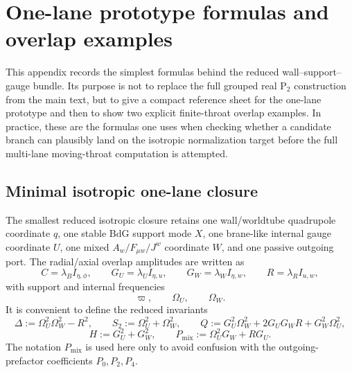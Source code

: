 \documentclass[11pt]{article}
\theoremstyle{definition}
\newcommand{\Ptwo}{\ensuremath{\mathrm{P}_2}}
\begin{document}
\section{One-lane prototype formulas and overlap examples}
\label{app:one-lane-overlap}

This appendix records the simplest formulas behind the reduced wall--support--gauge bundle. Its purpose is not to replace the full grouped real $\Ptwo$ construction from the main text, but to give a compact reference sheet for the one-lane prototype and then to show two explicit finite-throat overlap examples. In practice, these are the formulas one uses when checking whether a candidate branch can plausibly land on the isotropic normalization target before the full multi-lane moving-throat computation is attempted.

\subsection{Minimal isotropic one-lane closure}

The smallest reduced isotropic closure retains one wall/worldtube quadrupole coordinate $q$, one stable BdG support mode $X$, one brane-like internal gauge coordinate $U$, one mixed $A_w/F_{\mu w}/J^w$ coordinate $W$, and one passive outgoing port. The radial/axial overlap amplitudes are written as
\begin{equation}
 C=\lambda_B I_{\eta,\phi},
 \qquad
 G_U=\lambda_U I_{\eta,u},
 \qquad
 G_W=\lambda_W I_{\eta,w},
 \qquad
 R=\lambda_R I_{u,w},
 \label{eq:app-one-lane-overlaps}
\end{equation}
with support and internal frequencies
\begin{equation}
 \varpi,
 \qquad
 \Omega_U,
 \qquad
 \Omega_W.
 \label{eq:app-one-lane-frequencies}
\end{equation}
It is convenient to define the reduced invariants
\begin{equation}
 \Delta:=\Omega_U^2\Omega_W^2-R^2,
 \qquad
 S_2:=\Omega_U^2+\Omega_W^2,
 \qquad
 Q:=G_U^2\Omega_W^2+2G_UG_WR+G_W^2\Omega_U^2,
 \label{eq:app-one-lane-delta-q}
\end{equation}
\begin{equation}
 H:=G_U^2+G_W^2,
 \qquad
 P_{\mathrm{mix}}:=\Omega_U^2 G_W + R G_U.
 \label{eq:app-one-lane-h-pmix}
\end{equation}
The notation $P_{\mathrm{mix}}$ is used here only to avoid confusion with the outgoing-prefactor coefficients $P_0,P_2,P_4$.
\end{document}

